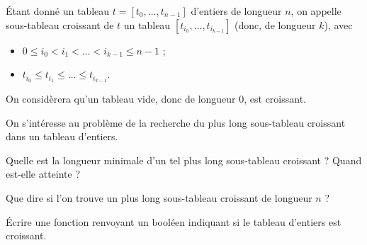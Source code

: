 \'Etant donné un tableau $t = [t_0,\dots,t_{n-1}]$ d'entiers de longueur $n$, on appelle sous-tableau croissant de $t$ un tableau $[t_{i_0},\dots,t_{i_{k-1}}]$ (donc, de longueur $k$), avec 
\begin{itemize}
  \item $0\leq i_0 < i_1 < \dots < i_{k-1} \leq n-1$ ;
  \item $t_{i_0}\leq t_{i_1} \leq \dots \leq t_{i_{k-1}}$.
\end{itemize}
On considèrera qu'un tableau vide, donc de longueur $0$, est croissant.

On s'intéresse au problème de la recherche du plus long sous-tableau croissant dans un tableau d'entiers. 

\question{} Quelle est la longueur minimale d'un tel plus long sous-tableau croissant ? Quand est-elle atteinte ?

\question{} Que dire si l'on trouve un plus long sous-tableau croissant de longueur $n$ ? 

\question{}  \'Ecrire une fonction  renvoyant un booléen indiquant si le tableau d'entiers  est croissant. 

